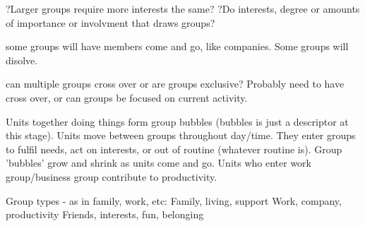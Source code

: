 ?Larger groups require more interests the same?
?Do interests, degree or amounts of importance or involvment that draws groups?

some groups will have members come and go, like companies. 
Some groups will disolve.

can multiple groups cross over or are groups exclusive? Probably need to have cross over, or can groups be focused on current activity.



Units together doing things form group bubbles (bubbles is just a descriptor at this stage).
Units move between groups throughout day/time. 
They enter groups to fulfil needs, act on interests, or out of routine (whatever routine is).
Group 'bubbles' grow and shrink as units come and go.
Units who enter work group/business group contribute to productivity. 

Group types - as in family, work, etc:
Family, living, support
Work, company, productivity
Friends, interests, fun, belonging



